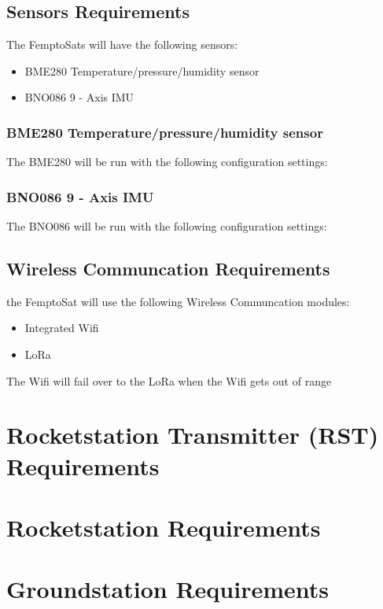 \documentclass{article}
\begin{document}
\subsection{Sensors Requirements}
\par The FemptoSats will have the following sensors: 
\begin{itemize}
    \item BME280 Temperature/pressure/humidity sensor
    \item BNO086 9 - Axis IMU
\end{itemize}

\subsubsection{BME280 Temperature/pressure/humidity sensor}
\par The BME280 will be run with the following configuration settings: 

\subsubsection{BNO086 9 - Axis IMU}
\par The BNO086 will be run with the following configuration settings:

\subsection{Wireless Communcation Requirements}
\par the FemptoSat will use the following Wireless Communcation modules:
\begin{itemize}
    \item Integrated Wifi
    \item LoRa
\end{itemize}
\par The Wifi will fail over to the LoRa when the Wifi gets out of range

\section{Rocketstation Transmitter (RST) Requirements}

\section{Rocketstation Requirements}

\section{Groundstation Requirements}
\end{document}
